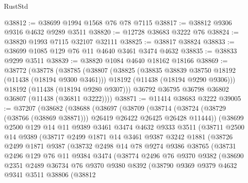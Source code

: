 \begin{lexlean}{RustStd}
\begin{coremodule}
@38812 := @38699 @1994 @1568 @76 @78 @7115
@38817 := @38812 @9306 @9316 @4632 @9289 @3511
@38820 := @12728 @38683 @3222 @76
@38824 := @38820 @1993 @7115 @32107 @32111
@38825 := @38817 @38824
@38833 := @38699 @1085 @129 @76 @11 @4640 @3461 @3474 @4632
@38835 := @38833 @9299 @3511
@38839 := @38820 @1084 @4640 @18162 @18166
@38869 := @38772
    (@38778
      (@38785
        (@38807
          (@38825
            (@38835 @38839 @38750 @18192 (@11438 (@18194 @9300 @3461)))
            @18192
            (@11438 (@18194 @9290 @9306)))
          @18192
          (@11438 (@18194 @9280 @9307)))
        @36792
        @36795
        @36798
        @36802
        @36807
        (@11438 (@36811 @3222))))
@38871 := @11414 @38683 @3222
@39005 := @37207
    (@38682
      (@38688
        (@38697
          (@38709
            (@38714 (@38724 (@38729 (@38766 (@38869 @38871))) @26419 @26422 @26425 @26428 @11444))
            (@38699
              @2500
              @129
              @14
              @11
              @9389
              @3461
              @3474
              @4632
              @9333
              @3511
              (@38711
                @2500
                @14
                @9389
                (@38717
                  @2499
                  @1871
                  @14
                  @3461
                  @9387
                  @3242
                  @1881
                  (@38726
                    @2499
                    @1871
                    @9387
                    (@38732
                      @2498
                      @14
                      @78
                      @9274
                      @9386
                      @38765
                      (@38731
                        @2496
                        @129
                        @76
                        @11
                        @9384
                        @3474
                        (@38774
                          @2496
                          @76
                          @9370
                          @9382
                          (@38690
                            @2351
                            @2489
                            @36734
                            @76
                            @9370
                            @9380
                            @8392
                            (@38790
                              @9369
                              @9379
                              @4632
                              @9341
                              @3511
                              @38806
                              (@38812

\end{coremodule}
\end{lexlean}

